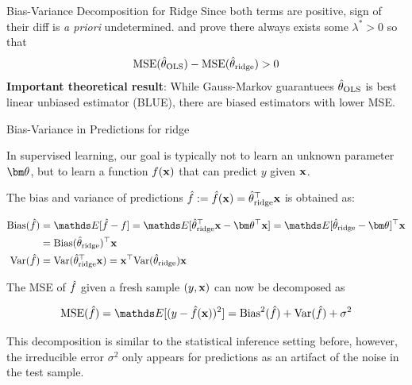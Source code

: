\documentclass[11pt,compress,t,notes=noshow, xcolor=table]{beamer}
\begin{document}
\begin{vbframe}{Bias-Variance Decomposition for Ridge}
Since both terms are positive, sign of their diff is \textit{a priori} undetermined.  and  prove there always exists some $\lambda^{\ast}>0$ so that
$$\text{MSE}(\hat{\theta}_{\text{OLS}})-\text{MSE}(\hat{\theta}_{\text{ridge}})>0$$
\textbf{Important theoretical result}: While Gauss-Markov guarantuees $\hat{\theta}_{\text{OLS}}$ is best linear unbiased estimator (BLUE), there are biased estimators with lower MSE.

\end{vbframe}

\begin{vbframe}{Bias-Variance in Predictions for ridge}

In supervised learning, our goal is typically not to learn an unknown parameter $\thetav$, but to learn a function $f(\mathbf{x})$ that can predict $y$ given $\mathbf{x}$.

\vspace{0.2cm}

The bias and variance of predictions $\hat{f}:=\hat{f}(\mathbf{x})=\hat{\theta}_{\text{ridge}}^{\top} \mathbf{x}$ is obtained as:

\begin{align*}
\text{Bias}(\fh)&=\E[\hat{f}-f]=\E[\thetah_{\text{ridge}}^{\top} \xv - \thetav^{\top} \xv]=\E[\thetah_{\text{ridge}}-\thetav]^{\top} \xv\\ 
&= \text{Bias}(\thetah_{\text{ridge}})^{\top} \xv \\
\text{Var}(\fh)&=\text{Var}(\thetah_{\text{ridge}}^{\top} \xv) = \xv^{\top} \text{Var}(\thetah_{\text{ridge}}) \xv
\end{align*}

The MSE of $\hat{f}$ given a fresh sample $(y,\mathbf{x})$ can now be decomposed as

$$\text{MSE}(\fh)=\E[(y-\fh(\xv))^2]=\text{Bias}^{2}(\fh) + \text{Var}(\fh) + \sigma^2$$

This decomposition is similar to the statistical inference setting before, however, the irreducible error $\sigma^2$ only appears for predictions as an artifact
of the noise in the test sample.

\end{vbframe}


\endlecture
\end{document}
